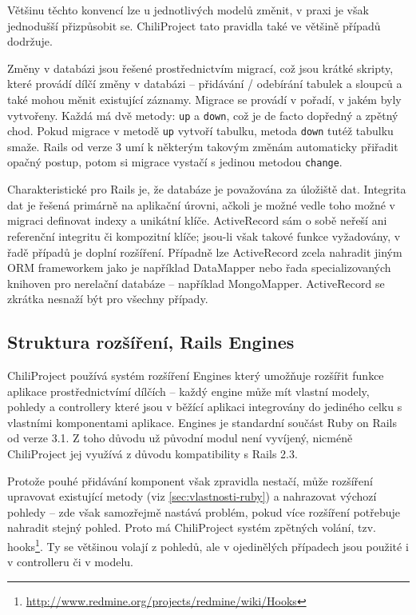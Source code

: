 \documentclass[thesis=B,czech]{FITthesis}[2012/05/02]
\begin{document}
Většinu těchto konvencí lze u jednotlivých modelů změnit, v praxi je
však jednodušší přizpůsobit se. ChiliProject tato pravidla také ve
většině případů dodržuje.

Změny v databázi jsou řešené prostřednictvím migrací, což jsou krátké
skripty, které provádí dílčí změny v databázi -- přidávání / odebírání
tabulek a sloupců a také mohou měnit existující záznamy. Migrace se
provádí v pořadí, v jakém byly vytvořeny. Každá má dvě metody:
\lstinline!up! a \lstinline!down!, což je de facto dopředný a zpětný
chod. Pokud migrace v metodě \lstinline!up! vytvoří tabulku, metoda
\lstinline!down! tutéž tabulku smaže. Rails od verze 3 umí k některým
takovým změnám automaticky přiřadit opačný postup, potom si migrace
vystačí s jedinou metodou \lstinline!change!.

Charakteristické pro Rails je, že databáze je považována za 
úložiště dat. Integrita dat je řešená primárně na aplikační úrovni,
ačkoli je možné vedle toho možné v migraci definovat indexy a unikátní
klíče. ActiveRecord sám o sobě neřeší ani referenční integritu či
kompozitní klíče; jsou-li však takové funkce vyžadovány, v řadě případů
je doplní rozšíření. Případně lze ActiveRecord zcela nahradit jiným ORM
frameworkem jako je například DataMapper nebo řada specializovaných
knihoven pro nerelační databáze -- například MongoMapper. ActiveRecord
se zkrátka nesnaží být  pro všechny případy.

\subsection{Struktura rozšíření, Rails Engines}

ChiliProject používá systém rozšíření Engines který umožňuje rozšířit
funkce aplikace prostřednictvímí dílčích  -- každý
engine může mít vlastní modely, pohledy a controllery které jsou
v běžící aplikaci integrovány do jediného celku s vlastními komponentami
aplikace. Engines je standardní součást Ruby on Rails od verze 3.1.
Z toho důvodu už původní modul není vyvíjený, nicméně ChiliProject jej
využívá z důvodu kompatibility s Rails 2.3.

Protože pouhé přidávání komponent však zpravidla nestačí, může rozšíření
upravovat existující metody (viz
\ref{sec:vlastnosti-ruby}) a
nahrazovat výchozí pohledy -- zde však samozřejmě nastává problém, pokud
více rozšíření potřebuje nahradit stejný pohled. Proto má ChiliProject
systém zpětných volání, tzv. hooks\footnote{\url{http://www.redmine.org/projects/redmine/wiki/Hooks}}.
Ty se většinou volají z pohledů, ale v ojedinělých případech jsou
použité i v controlleru či v modelu.
\end{document}
